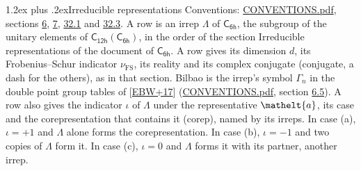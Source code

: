 \documentclass[10pt,a4paper]{article}
\makeatletter
\renewcommand\section{\@startsection{section}{1}{\z@}{-3ex plus -1ex minus -.2ex}%
  {1.2ex plus .2ex}{\normalfont\large\sffamily\bfseries\color{parttitle}}}
\numberwithin{equation}{section}
\newcommand{\eltfont}[1]{{\let\sigma\eltsigma\mathelt{#1}}}
\newcommand{\grp}[1]{\mathsf{#1}}
\newcommand{\elt}[1]{\eltfont{#1}}
\newcommand{\fsind}{\nu_{\mathrm{FS}}}
\makeatother
\begin{document}
\section{Irreducible representations}\label{s:irreps}
Conventions: \href{../../CONVENTIONS.pdf}{CONVENTIONS.pdf}, sections \href{../../../rotation/CONVENTIONS.pdf\#conv.6}{6}, \href{../../../rotation/CONVENTIONS.pdf\#conv.7}{7}, \href{../../CONVENTIONS.pdf\#conv.32.1}{32.1} and \href{../../CONVENTIONS.pdf\#conv.32.3}{32.3}.
\leavevmode\label{n:irrep.Delta}A row is an irrep $\Lambda$ of $\grp{C_{6h}}$, the subgroup of the unitary elements of $\grp{C_{12h}}(\grp{C_{6h}})$, in the order of the section Irreducible representations of the document of \href{../../../rotation/data/pdf/C6h.pdf}{$\grp{C_{6h}}$}. \label{n:index.dimension}\label{n:index.frobenius}\label{n:head.irrep}\label{n:head.reality}\label{n:head.conjugate}A row gives its dimension $d$, its Frobenius--Schur indicator $\fsind$, its reality and its complex conjugate (conjugate, a dash for the others), as in that section. \label{n:head.bilbao}\label{n:irrep.alias.gamma}Bilbao is the irrep's symbol $\Gamma_n$ in the double point group tables of [\href{../../../REFERENCES.pdf\#ref.EBW+17}{EBW+17}] (\href{../../CONVENTIONS.pdf}{CONVENTIONS.pdf}, section \href{../../../rotation/CONVENTIONS.pdf\#conv.6.5}{6.5}). \label{n:head.case.corep}\label{n:head.corep}A row also gives the indicator $\iota$ of $\Lambda$ under the representative $\elt{a}$, its case and the corepresentation that contains it (corep), named by its irreps. In case (a), $\iota = +1$ and $\Lambda$ alone forms the corepresentation. In case (b), $\iota = -1$ and two copies of $\Lambda$ form it. In case (c), $\iota = 0$ and $\Lambda$ forms it with its partner, another irrep.
\setlength{\emergencystretch}{2em}\par\setlength{\emergencystretch}{0pt}
\end{document}
